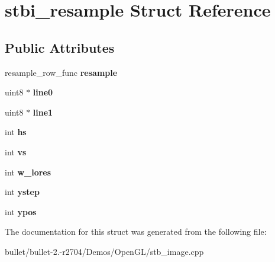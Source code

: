 \hypertarget{structstbi__resample}{\section{stbi\+\_\+resample Struct Reference}
\label{structstbi__resample}
}
\subsection*{Public Attributes}
\begin{DoxyCompactItemize}
\item 
\hypertarget{structstbi__resample_a94091463ebc5933cdaf7a813025b6e19}{resample\+\_\+row\+\_\+func {\bfseries resample}}\label{structstbi__resample_a94091463ebc5933cdaf7a813025b6e19}

\item 
\hypertarget{structstbi__resample_a30c51395efffb663b183d7c64def6db3}{uint8 $\ast$ {\bfseries line0}}\label{structstbi__resample_a30c51395efffb663b183d7c64def6db3}

\item 
\hypertarget{structstbi__resample_ac1165a6da3cf652b951056667f89b1f2}{uint8 $\ast$ {\bfseries line1}}\label{structstbi__resample_ac1165a6da3cf652b951056667f89b1f2}

\item 
\hypertarget{structstbi__resample_a1513390ba0102364169a52ff26d5e0f2}{int {\bfseries hs}}\label{structstbi__resample_a1513390ba0102364169a52ff26d5e0f2}

\item 
\hypertarget{structstbi__resample_a331c717f53239339c0c678f92a7bf4d5}{int {\bfseries vs}}\label{structstbi__resample_a331c717f53239339c0c678f92a7bf4d5}

\item 
\hypertarget{structstbi__resample_a41d43c7b0d6caafbf0dfa8ef064bd2a2}{int {\bfseries w\+\_\+lores}}\label{structstbi__resample_a41d43c7b0d6caafbf0dfa8ef064bd2a2}

\item 
\hypertarget{structstbi__resample_a0c479143447d103e73348c89f8b4ef1c}{int {\bfseries ystep}}\label{structstbi__resample_a0c479143447d103e73348c89f8b4ef1c}

\item 
\hypertarget{structstbi__resample_aa1f1ad33e739f7a38fbad8752f64f983}{int {\bfseries ypos}}\label{structstbi__resample_aa1f1ad33e739f7a38fbad8752f64f983}

\end{DoxyCompactItemize}


The documentation for this struct was generated from the following file\+:\begin{DoxyCompactItemize}
\item 
bullet/bullet-\/2.-\/r2704/\+Demos/\+Open\+G\+L/stb\+\_\+image.\+cpp\end{DoxyCompactItemize}
